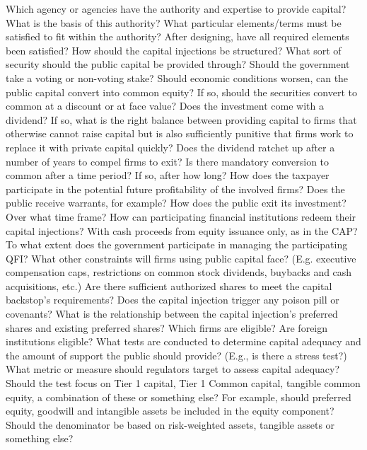 \documentclass[12pt]{article}
\begin{document}
\begin{outline}[enumerate]

\1 Which agency or agencies have the authority and expertise to provide capital?
\2 What is the basis of this authority?
\2 What particular elements/terms must be satisfied to fit within the authority?
\2 After designing, have all required elements been satisfied?
\1 How should the capital injections be structured?
\2 What sort of security should the public capital be provided through?
\2 Should the government take a voting or non-voting stake?
\2 Should economic conditions worsen, can the public capital convert into common equity?
\3 If so, should the securities convert to common at a discount or at face value?
\2 Does the investment come with a dividend? If so, what is the right balance between providing capital to firms that otherwise cannot raise capital but is also sufficiently punitive that firms work to replace it with private capital quickly?
\2 Does the dividend ratchet up after a number of years to compel firms to exit?
\2 Is there mandatory conversion to common after a time period? If so, after how long?
\2 How does the taxpayer participate in the potential future profitability of the involved firms? Does the public receive warrants, for example?
\2 How does the public exit its investment? Over what time frame?
\2 How can participating financial institutions redeem their capital injections? With cash proceeds from equity issuance only, as in the CAP?
\1 To what extent does the government participate in managing the participating QFI?
\2 What other constraints will firms using public capital face? (E.g. executive compensation caps, restrictions on common stock dividends, buybacks and cash acquisitions, etc.)
\2 Are there sufficient authorized shares to meet the capital backstop's requirements?
\2 Does the capital injection trigger any poison pill or covenants?
\2 What is the relationship between the capital injection's preferred shares and existing preferred shares?
\1 Which firms are eligible?
\2 Are foreign institutions eligible?
\2 What tests are conducted to determine capital adequacy and the amount of support the public should provide? (E.g., is there a stress test?)
\2 What metric or measure should regulators target to assess capital adequacy?
\3 Should the test focus on Tier 1 capital, Tier 1 Common capital, tangible common equity, a combination of these or something else?
\4 For example, should preferred equity, goodwill and intangible assets be included in the equity component?
\4 Should the denominator be based on risk-weighted assets, tangible assets or something else?

\end{outline}
\end{document}
